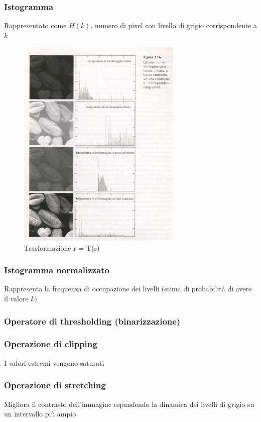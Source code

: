 \documentclass[12pt]{article}
\begin{document}
\subsubsection{Istogramma}
Rappresentato come $H(k)$, numero di pixel con livello di grigio corrispondente a $k$
\begin{figure}[!htb]
    \centering
    \includegraphics[width=0.7\textwidth]{Images/hist.png}
    \caption{Trasformazione r = T(s)}
\end{figure}
\FloatBarrier
\subsubsection{Istogramma normalizzato}
Rappresenta la frequenza di occupazione dei livelli (stima di probabilità di avere il valore $k$)
\subsubsection{Operatore di thresholding (binarizzazione)}
\subsubsection{Operazione di clipping}
I valori estremi vengono saturati
\subsubsection{Operazione di stretching}
Migliora il contrasto dell'immagine espandendo la dinamica dei livelli di grigio su un intervallo più ampio
\newpage
\end{document}
